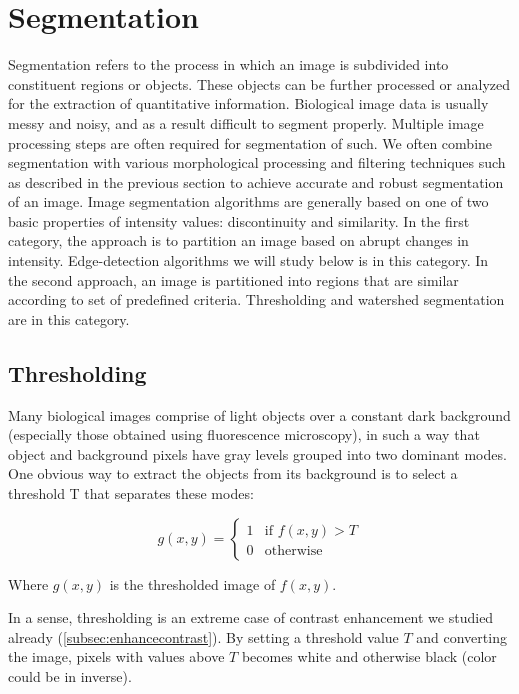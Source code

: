 
\section{Segmentation}
\label{sec:segmentation}

Segmentation refers to the process in which an image is subdivided into
constituent regions or objects. These objects can be further
processed or analyzed for the extraction of quantitative information.
Biological image data is usually messy and noisy, and as a result
difficult to segment properly. Multiple image processing steps are
often required for segmentation of such. We often combine segmentation
with various morphological processing and filtering techniques such as
described in the previous section to achieve accurate and robust
segmentation of an image.
Image segmentation algorithms are generally based on one of two basic
properties of intensity values: discontinuity and similarity. In the
first category, the approach is to partition an image based on abrupt
changes in intensity. Edge-detection algorithms we will study below is
in this category. In the second approach, an image is partitioned into
regions that are similar according to set of predefined criteria.
Thresholding and watershed segmentation are in this category.

\subsection{Thresholding}

Many biological images comprise of light objects over a constant dark
background (especially those obtained using fluorescence microscopy),
in such a way that object and background pixels have gray levels
grouped into two dominant modes. One obvious way to extract the objects
from its background is to select a threshold T that separates these
modes:

\begin{equation}
g(x,y)= 
\begin{cases}
1 & \text{if $f(x, y) > T$}\\
0 & \text{otherwise}
\end{cases}
\end{equation}

Where $g(x,y)$ is the thresholded image of
$f(x,y)$.

In a sense, thresholding is an extreme case of contrast enhancement we
studied already (\ref{subsec:enhancecontrast}). By setting a threshold value $T$ and
converting the image, pixels with values above $T$ becomes white and
otherwise black (color could be in inverse). 

